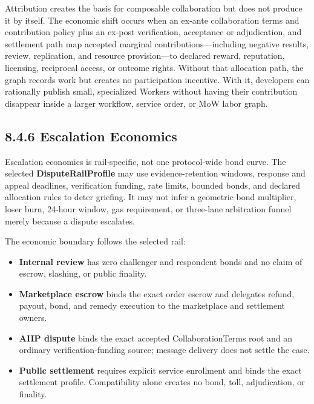 \documentclass[
  11pt,
]{article}
\providecommand{\tightlist}{%
  \setlength{\itemsep}{0pt}\setlength{\parskip}{0pt}}
\begin{document}
Attribution creates the basis for composable collaboration but does not produce
it by itself. The economic shift occurs when an ex-ante collaboration terms and
contribution policy plus an ex-post verification, acceptance or adjudication,
and settlement path map accepted marginal contributions---including negative
results, review, replication, and resource provision---to declared reward,
reputation, licensing, reciprocal access, or outcome rights. Without that
allocation path, the graph records work but creates no participation incentive.
With it, developers can rationally publish small, specialized Workers without
having their contribution disappear inside a larger workflow, service order, or
MoW labor graph.

\hypertarget{escalation-economics}{%
\subsection{8.4.6 Escalation Economics}\label{escalation-economics}}

Escalation economics is rail-specific, not one protocol-wide bond curve. The
selected \textbf{DisputeRailProfile} may use evidence-retention windows,
response and appeal deadlines, verification funding, rate limits, bounded
bonds, and declared allocation rules to deter griefing. It may not infer a
geometric bond multiplier, loser burn, 24-hour window, gas requirement, or
three-lane arbitration funnel merely because a dispute escalates.

The economic boundary follows the selected rail:

\begin{itemize}
\tightlist
\item
  \textbf{Internal review} has zero challenger and respondent bonds and no
  claim of escrow, slashing, or public finality.
\item
  \textbf{Marketplace escrow} binds the exact order escrow and delegates
  refund, payout, bond, and remedy execution to the marketplace and settlement
  owners.
\item
  \textbf{AIIP dispute} binds the exact accepted CollaborationTerms root and
  an ordinary verification-funding source; message delivery does not settle
  the case.
\item
  \textbf{Public settlement} requires explicit service enrollment and binds
  the exact settlement profile. Compatibility alone creates no bond, toll,
  adjudication, or finality.
\end{itemize}
\end{document}

